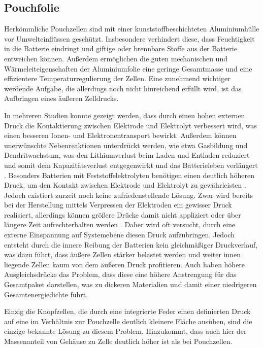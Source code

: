 \subsection{Pouchfolie}
Herkömmliche Pouchzellen sind mit einer kunststoffbeschichteten Aluminiumhülle vor Umwelteinflüssen geschützt. Insbesondere verhindert diese, dass Feuchtigkeit in die Batterie eindringt und giftige oder brennbare Stoffe aus der Batterie entweichen können. Außerdem ermöglichen die guten mechanischen und Wärmeleiteigenschaften der Aluminiumfolie eine geringe Gesamtmasse und eine effizientere Temperaturregulierung der Zellen. Eine zunehmend wichtiger werdende Aufgabe, die allerdings noch nicht hinreichend erfüllt wird, ist das Aufbringen eines äußeren Zelldrucks.

In mehreren Studien konnte gezeigt werden, dass durch einen hohen externen Druck die Kontaktierung zwischen Elektrode und Elektrolyt verbessert wird, was einen besseren Ionen- und Elektronentransport bewirkt. Außerdem können unerwünschte Nebenreaktionen unterdrückt werden, wie etwa Gasbildung und Dendritwachstum, was den Lithiumverlust beim Laden und Entladen reduziert und somit dem Kapazitätsverlust entgegenwirkt und das Batterieleben verlängert \cite{Mussa2018,Mueller2019,Sakamoto2019}. Besonders Batterien mit Feststoffelektrolyten benötigen einen deutlich höheren Druck, um den Kontakt zwischen Elektrode und Elektrolyt zu gewährleisten \cite{Boaretto2021}. Jedoch existiert zurzeit noch keine zufriedenstellende Lösung. Zwar wird bereits bei der Herstellung mittels Verpressen der Elektroden ein gewisser Druck realisiert, allerdings können größere Drücke damit nicht appliziert oder über längere Zeit aufrechterhalten werden \cite{Garayt2023}. Daher wird oft versucht, durch eine externe Einspannung auf Systemebene diesen Druck aufzubringen. Jedoch entsteht durch die innere Reibung der Batterien kein gleichmäßiger Druckverlauf, was dazu führt, dass äußere Zellen stärker belastet werden und weiter innen liegende Zellen kaum von dem äußeren Druck profitieren. Auch haben höhere Ausgleichsdrücke das Problem, dass diese eine höhere Anstrengung für das Gesamtpaket darstellen, was zu dickeren Materialien und damit einer niedrigeren Gesamtenergiedichte führt.

Einzig die Knopfzellen, die durch eine integrierte Feder einen definierten Druck auf eine im Verhältnis zur Pouchzelle deutlich kleinere Fläche ausüben, sind die einzige bekannte Lösung zu diesem Problem. Hinzukommt, dass auch hier der Massenanteil von Gehäuse zu Zelle deutlich höher ist als bei Pouchzellen.

